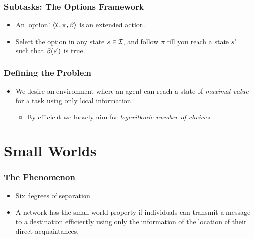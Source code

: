 \documentclass{beamer}
\begin{document}
\begin{frame}
    \frametitle{Subtasks: The Options Framework}
    \label{frame:abstraction-options}

    \begin{itemize}
        \item An `option' $\langle  \mathcal{I}, \pi, \beta  \rangle$ is an extended action.
        \item Select the option in any state $s \in \mathcal{I}$, and follow $\pi$
            till you reach a state $s'$ such that $\beta(s')$ is true.
    \end{itemize}
\end{frame}

\begin{frame}
    \frametitle{Defining the Problem}
    \label{frame:abstraction-problem}
    \begin{itemize}
        \item We desire an environment where an agent can reach a state of {\em
            maximal value} for a task using only local information.
            \pause
            \begin{itemize}
                \item By efficient we loosely aim for {\em logarithmic number of choices}.
            \end{itemize}
    \end{itemize}
\end{frame}

\section{Small Worlds}
\label{sec:small-worlds}

\begin{frame}
    \frametitle{The Phenomenon}
    \label{frame:small-worlds-phenomenon}

    \begin{itemize}
            \item Six degrees of separation
            \pause
            \item A network has the small world property if individuals can
                transmit a message to a destination efficiently using only the
                information of the location of their direct acquaintances.
    \end{itemize}

\end{frame}
\end{document}
